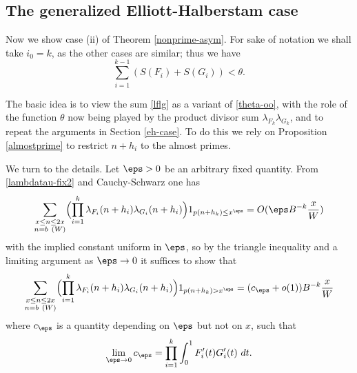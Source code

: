 \subsection{The generalized Elliott-Halberstam case}\label{geh-case}

Now we show case (ii) of Theorem \ref{nonprime-asym}.  For sake of notation we shall take $i_0=k$, as the other cases are similar; thus we have
\begin{equation}\label{ik1}
\sum_{i=1}^{k-1} (S(F_{i}) + S(G_{i})) < \theta.
\end{equation}

The basic idea is to view the sum \eqref{lflg} as a variant of \eqref{theta-oo}, with the role of the function $\theta$ now being played by the product divisor sum $\lambda_{F_k} \lambda_{G_k}$, and to repeat the arguments in Section \ref{eh-case}.  To do this we rely on Proposition \ref{almostprime} to restrict $n+h_i$ to the almost primes.

We turn to the details.  Let $\eps > 0$ be an arbitrary fixed quantity.  From \eqref{lambdatau-fix2} and Cauchy-Schwarz one has
$$
 \sum_{\substack{x \leq n \leq 2x\\ n = b\ (W)}} \Bigl(\prod_{i=1}^k \lambda_{F_{i}}(n+h_{i}) \lambda_{G_{i}}(n+h_{i})\Bigr) 1_{p(n+h_k) \leq x^\eps} = O( \eps B^{-k} \frac{x}{W} )
$$
with the implied constant uniform in $\eps$,
so by the triangle inequality and a limiting argument as $\eps \to 0$ it suffices to show that
\begin{equation}\label{lltrunc}
 \sum_{\substack{x \leq n \leq 2x\\ n = b\ (W)}} \Bigl( \prod_{i=1}^k \lambda_{F_{i}}(n+h_{i}) \lambda_{G_{i}}(n+h_{i}) \Bigr)1_{p(n+h_k) > x^\eps} = (c_\eps + o(1)) B^{-k} \frac{x}{W} 
\end{equation}
where $c_\eps$ is a quantity depending on $\eps$ but not on $x$, such that
$$ \lim_{\eps \to 0} c_\eps = \prod_{i=1}^k \int_0^1 F'_i(t) G'_i(t)\ dt.$$

